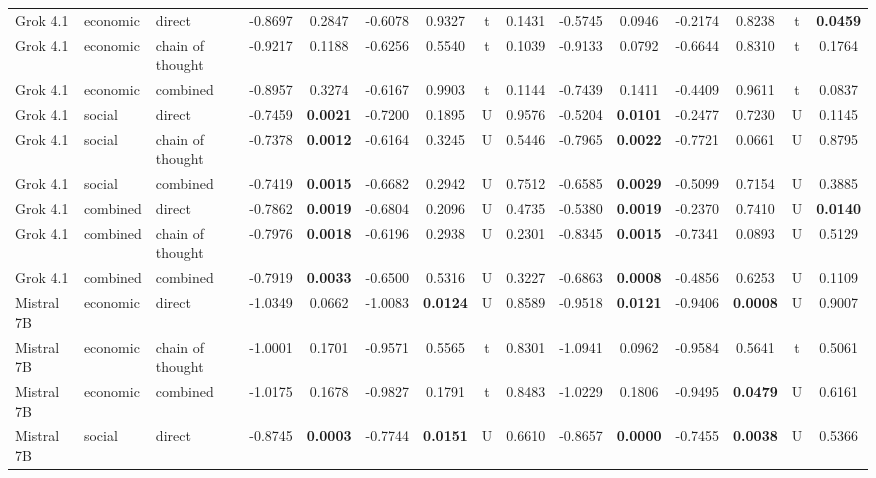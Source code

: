 \begin{center}
\begin{longtable}{@{}lll|cccccc|cccccc@{}}
        Grok 4.1 & economic & direct & -0.8697 & 0.2847 & -0.6078 & 0.9327 & t & 0.1431 & -0.5745 & 0.0946 & -0.2174 & 0.8238 & t & \textbf{0.0459} \\
        Grok 4.1 & economic & chain of thought & -0.9217 & 0.1188 & -0.6256 & 0.5540 & t & 0.1039 & -0.9133 & 0.0792 & -0.6644 & 0.8310 & t & 0.1764 \\
        Grok 4.1 & economic & combined & -0.8957 & 0.3274 & -0.6167 & 0.9903 & t & 0.1144 & -0.7439 & 0.1411 & -0.4409 & 0.9611 & t & 0.0837 \\
        Grok 4.1 & social & direct & -0.7459 & \textbf{0.0021} & -0.7200 & 0.1895 & U & 0.9576 & -0.5204 & \textbf{0.0101} & -0.2477 & 0.7230 & U & 0.1145 \\
        Grok 4.1 & social & chain of thought & -0.7378 & \textbf{0.0012} & -0.6164 & 0.3245 & U & 0.5446 & -0.7965 & \textbf{0.0022} & -0.7721 & 0.0661 & U & 0.8795 \\
        Grok 4.1 & social & combined & -0.7419 & \textbf{0.0015} & -0.6682 & 0.2942 & U & 0.7512 & -0.6585 & \textbf{0.0029} & -0.5099 & 0.7154 & U & 0.3885 \\
        Grok 4.1 & combined & direct & -0.7862 & \textbf{0.0019} & -0.6804 & 0.2096 & U & 0.4735 & -0.5380 & \textbf{0.0019} & -0.2370 & 0.7410 & U & \textbf{0.0140} \\
        Grok 4.1 & combined & chain of thought & -0.7976 & \textbf{0.0018} & -0.6196 & 0.2938 & U & 0.2301 & -0.8345 & \textbf{0.0015} & -0.7341 & 0.0893 & U & 0.5129 \\
        \rowcolor{gray!20} Grok 4.1 & combined & combined & -0.7919 & \textbf{0.0033} & -0.6500 & 0.5316 & U & 0.3227 & -0.6863 & \textbf{0.0008} & -0.4856 & 0.6253 & U & 0.1109 \\
        Mistral 7B & economic & direct & -1.0349 & 0.0662 & -1.0083 & \textbf{0.0124} & U & 0.8589 & -0.9518 & \textbf{0.0121} & -0.9406 & \textbf{0.0008} & U & 0.9007 \\
        Mistral 7B & economic & chain of thought & -1.0001 & 0.1701 & -0.9571 & 0.5565 & t & 0.8301 & -1.0941 & 0.0962 & -0.9584 & 0.5641 & t & 0.5061 \\
        Mistral 7B & economic & combined & -1.0175 & 0.1678 & -0.9827 & 0.1791 & t & 0.8483 & -1.0229 & 0.1806 & -0.9495 & \textbf{0.0479} & U & 0.6161 \\
        Mistral 7B & social & direct & -0.8745 & \textbf{0.0003} & -0.7744 & \textbf{0.0151} & U & 0.6610 & -0.8657 & \textbf{0.0000} & -0.7455 & \textbf{0.0038} & U & 0.5366 \\

\end{longtable}
\end{center}
